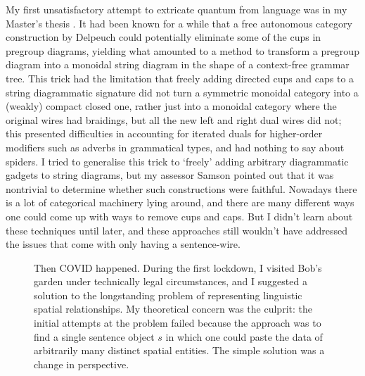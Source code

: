 My first unsatisfactory attempt to extricate quantum from language was in my Master's thesis \citep{wang_graphical_2019}. It had been known for a while that a free autonomous category construction by Delpeuch \citep{delpeuch_autonomization_2020} could potentially eliminate some of the cups in pregroup diagrams, yielding what amounted to a method to transform a pregroup diagram into a monoidal string diagram in the shape of a context-free grammar tree. This trick had the limitation that freely adding directed cups and caps to a string diagrammatic signature did not turn a symmetric monoidal category into a (weakly) compact closed one, rather just into a monoidal category where the original wires had braidings, but all the new left and right dual wires did not; this presented difficulties in accounting for iterated duals for higher-order modifiers such as adverbs in grammatical types, and had nothing to say about spiders. I tried to generalise this trick to `freely' adding arbitrary diagrammatic gadgets to string diagrams, but my assessor Samson pointed out that it was nontrivial to determine whether such constructions were faithful. Nowadays there is a lot of categorical machinery lying around, and there are many different ways one could come up with ways to remove cups and caps. But I didn't learn about these techniques until later, and these approaches still wouldn't have addressed the issues that come with only having a sentence-wire.

\begin{figure}[h!]
\centering
{}
\caption{Then COVID happened. During the first lockdown, I visited Bob's garden under technically legal circumstances, and I suggested a solution to the longstanding problem of representing linguistic spatial relationships. My theoretical concern was the culprit: the initial attempts at the problem failed because the approach was to find a single sentence object $s$ in which one could paste the data of arbitrarily many distinct spatial entities. The simple solution was a change in perspective.}
\end{figure}

